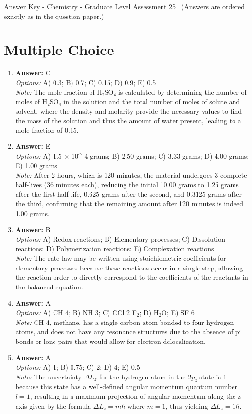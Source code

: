 \documentclass[12pt]{article}
\begin{document}
\begin{center}
Answer Key - Chemistry - Graduate Level Assessment 25 \
\small (Answers are ordered exactly as in the question paper.)
\end{center}

\section*{Multiple Choice}
\begin{enumerate}[label=\arabic*.]
\item \textbf{Answer:} C
\\ \textit{Options:} A) 0.3; B) 0.7; C) 0.15; D) 0.9; E) 0.5
\\ \textit{Note:} The mole fraction of H₂SO₄ is calculated by determining the number of moles of H₂SO₄ in the solution and the total number of moles of solute and solvent, where the density and molarity provide the necessary values to find the mass of the solution and thus the amount of water present, leading to a mole fraction of 0.15.
\item \textbf{Answer:} E
\\ \textit{Options:} A) 1.5 \ensuremath{\times} 10^-4 grams; B) 2.50 grams; C) 3.33 grams; D) 4.00 grams; E) 1.00 grams
\\ \textit{Note:} After 2 hours, which is 120 minutes, the material undergoes 3 complete half-lives (36 minutes each), reducing the initial 10.00 grams to 1.25 grams after the first half-life, 0.625 grams after the second, and 0.3125 grams after the third, confirming that the remaining amount after 120 minutes is indeed 1.00 grams.
\item \textbf{Answer:} B
\\ \textit{Options:} A) Redox reactions; B) Elementary processes; C) Dissolution reactions; D) Polymerization reactions; E) Complexation reactions
\\ \textit{Note:} The rate law may be written using stoichiometric coefficients for elementary processes because these reactions occur in a single step, allowing the reaction order to directly correspond to the coefficients of the reactants in the balanced equation.
\item \textbf{Answer:} A
\\ \textit{Options:} A) CH 4; B) NH 3; C) CCl 2 F$_{2}$; D) H$_{2}$O; E) SF 6
\\ \textit{Note:} CH 4, methane, has a single carbon atom bonded to four hydrogen atoms, and does not have any resonance structures due to the absence of pi bonds or lone pairs that would allow for electron delocalization.
\item \textbf{Answer:} A
\\ \textit{Options:} A) 1; B) 0.75; C) 2; D) 4; E) 0.5
\\ \textit{Note:} The uncertainty $\Delta L_z$ for the hydrogen atom in the $2 p_z$ state is 1 because this state has a well-defined angular momentum quantum number $l=1$, resulting in a maximum projection of angular momentum along the z-axis given by the formula $\Delta L_z = m \hbar$ where $m=1$, thus yielding $\Delta L_z = 1 \hbar$.
\end{enumerate}
\end{document}
